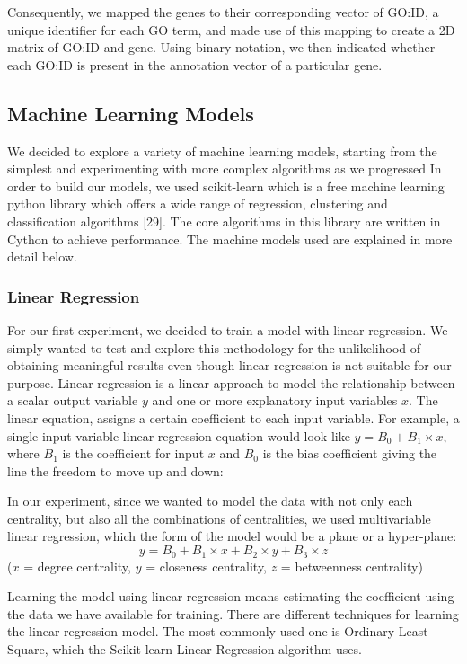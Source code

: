 \documentclass[9pt]{article}
\begin{document}
Consequently, we mapped the genes to their corresponding vector of GO:ID, a unique identifier for each GO term, and made use of this mapping to create a 2D matrix of GO:ID and gene. Using binary notation, we then indicated whether each GO:ID is present in the annotation vector of a particular gene.


\subsection{Machine Learning Models}
We decided to explore a variety of machine learning models, starting from the simplest and experimenting with more complex algorithms as we progressed In order to build our models, we used scikit-learn which is a free machine learning python library which offers a wide range of regression, clustering and classification algorithms [29]. The core algorithms in this library are written in Cython to achieve performance. The machine models used are explained in more detail below. 

\subsubsection{Linear Regression}
For our first experiment, we decided to train a model with linear regression. We simply wanted to test and explore this methodology for the unlikelihood of obtaining meaningful results even though linear regression is not suitable for our purpose. Linear regression is a linear approach to model the relationship between a scalar output variable \(y\) and one or more explanatory input variables \(x\). The linear equation, assigns a certain coefficient to each input variable. For example, a single input variable linear regression equation would look like $y = B_0 + B_1\times{x}$, where \(B_1\) is the coefficient for input \(x\) and \(B_0\) is the bias coefficient giving the line the freedom to move up and down: 

In our experiment, since we wanted to model the data with not only each centrality, but also all the combinations of centralities, we used multivariable linear regression, which the form of the model would be a plane or a hyper-plane:
\begin{equation}
y=B_0 + B_1\times{x} + B_2\times{y} + B_3\times{z}  
\end{equation}
(\(x\) = degree centrality, \(y\) = closeness centrality, \(z\) = betweenness centrality)

Learning the model using linear regression means estimating the coefficient using the data we have available for training. There are different techniques for learning the linear regression model. The most commonly used one is Ordinary Least Square, which the Scikit-learn Linear Regression algorithm uses. 
\end{document}
